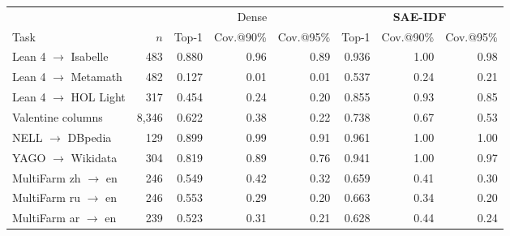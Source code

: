 \begin{tabular}{@{}lrrrrrrr@{}}
\toprule
 & & \multicolumn{3}{c}{Dense} & \multicolumn{3}{c}{\textbf{SAE-IDF}} \\
\cmidrule(lr){3-5}\cmidrule(lr){6-8}
Task & $n$ & Top-1 & Cov.@90\% & Cov.@95\% & Top-1 & Cov.@90\% & Cov.@95\% \\
\midrule
Lean 4 $\to$ Isabelle & 483 & 0.880 & 0.96 & 0.89 & 0.936 & 1.00 & 0.98 \\
Lean 4 $\to$ Metamath & 482 & 0.127 & 0.01 & 0.01 & 0.537 & 0.24 & 0.21 \\
Lean 4 $\to$ HOL Light & 317 & 0.454 & 0.24 & 0.20 & 0.855 & 0.93 & 0.85 \\
Valentine columns & 8,346 & 0.622 & 0.38 & 0.22 & 0.738 & 0.67 & 0.53 \\
NELL $\to$ DBpedia & 129 & 0.899 & 0.99 & 0.91 & 0.961 & 1.00 & 1.00 \\
YAGO $\to$ Wikidata & 304 & 0.819 & 0.89 & 0.76 & 0.941 & 1.00 & 0.97 \\
MultiFarm zh $\to$ en & 246 & 0.549 & 0.42 & 0.32 & 0.659 & 0.41 & 0.30 \\
MultiFarm ru $\to$ en & 246 & 0.553 & 0.29 & 0.20 & 0.663 & 0.34 & 0.20 \\
MultiFarm ar $\to$ en & 239 & 0.523 & 0.31 & 0.21 & 0.628 & 0.44 & 0.24 \\
\bottomrule
\end{tabular}
